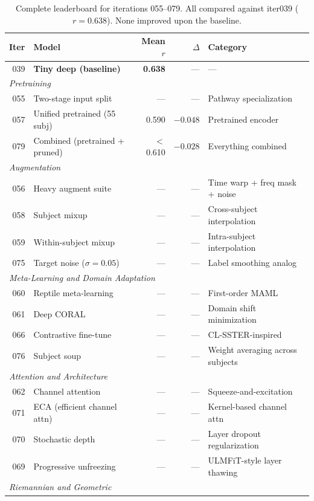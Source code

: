\documentclass[11pt,a4paper]{article}
\begin{document}
\begin{table}[H]
\centering
\small
\caption{Complete leaderboard for iterations 055--079. All compared
  against iter039 ($r = 0.638$). None improved upon the baseline.}
\begin{tabular}{rlrrl}
\toprule
Iter & Model & Mean $r$ & $\Delta$ & Category \\
\midrule
039 & \textbf{Tiny deep (baseline)} & \textbf{0.638} & --- & --- \\
\midrule
\multicolumn{5}{l}{\textit{Pretraining}} \\
055 & Two-stage input split & --- & --- & Pathway specialization \\
057 & Unified pretrained (55 subj) & 0.590 & \textcolor{bad}{$-0.048$} & Pretrained encoder \\
079 & Combined (pretrained + pruned) & $<$0.610 & \textcolor{bad}{$-0.028$} & Everything combined \\
\midrule
\multicolumn{5}{l}{\textit{Augmentation}} \\
056 & Heavy augment suite & --- & --- & Time warp + freq mask + noise \\
058 & Subject mixup & --- & --- & Cross-subject interpolation \\
059 & Within-subject mixup & --- & --- & Intra-subject interpolation \\
075 & Target noise ($\sigma=0.05$) & --- & --- & Label smoothing analog \\
\midrule
\multicolumn{5}{l}{\textit{Meta-Learning and Domain Adaptation}} \\
060 & Reptile meta-learning & --- & --- & First-order MAML \\
061 & Deep CORAL & --- & --- & Domain shift minimization \\
066 & Contrastive fine-tune & --- & --- & CL-SSTER-inspired \\
076 & Subject soup & --- & --- & Weight averaging across subjects \\
\midrule
\multicolumn{5}{l}{\textit{Attention and Architecture}} \\
062 & Channel attention & --- & --- & Squeeze-and-excitation \\
071 & ECA (efficient channel attn) & --- & --- & Kernel-based channel attn \\
070 & Stochastic depth & --- & --- & Layer dropout regularization \\
069 & Progressive unfreezing & --- & --- & ULMFiT-style layer thawing \\
\midrule
\multicolumn{5}{l}{\textit{Riemannian and Geometric}} \\

\end{tabular}
\end{table}
\end{document}
